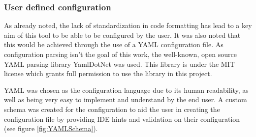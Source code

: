 \newpage

\subsubsection{User defined configuration}



As already noted, the lack of standardization in code formatting has lead to a key aim of this tool to be able to be configured by the user. It was also noted that this would be achieved through the use of a YAML configuration file. As configuration parsing isn't the goal of this work, the well-known, open source YAML parsing library YamlDotNet was used. This library is under the MIT license which grants full permission to use the library in this project.

YAML was chosen as the configuration language due to its human readability, as well as being very easy to implement and understand by the end user. A custom schema was created for the configuration to aid the user in creating the configuration file by providing IDE hints and validation on their configuration (see figure \ref{fig:YAMLSchema}).

